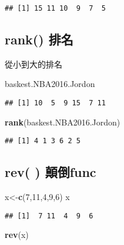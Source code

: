 \documentclass[]{article}
\newenvironment{Shaded}{\begin{snugshade}}{\end{snugshade}}
\newcommand{\DecValTok}[1]{\textcolor[rgb]{0.00,0.00,0.81}{#1}}
\newcommand{\KeywordTok}[1]{\textcolor[rgb]{0.13,0.29,0.53}{\textbf{#1}}}
\newcommand{\NormalTok}[1]{#1}
\begin{document}
\begin{verbatim}
## [1] 15 11 10  9  7  5
\end{verbatim}

\hypertarget{rank-ux6392ux540d}{%
\subsection{rank() 排名}\label{rank-ux6392ux540d}}

從小到大的排名

\begin{Shaded}
\begin{Highlighting}[]
\NormalTok{baskest.NBA2016.Jordon}
\end{Highlighting}
\end{Shaded}

\begin{verbatim}
## [1] 10  5  9 15  7 11
\end{verbatim}

\begin{Shaded}
\begin{Highlighting}[]
\KeywordTok{rank}\NormalTok{(baskest.NBA2016.Jordon)}
\end{Highlighting}
\end{Shaded}

\begin{verbatim}
## [1] 4 1 3 6 2 5
\end{verbatim}

\hypertarget{rev-ux985bux5012func}{%
\subsection{rev( ) 顛倒func}\label{rev-ux985bux5012func}}

\begin{Shaded}
\begin{Highlighting}[]
\NormalTok{x<-}\KeywordTok{c}\NormalTok{(}\DecValTok{7}\NormalTok{,}\DecValTok{11}\NormalTok{,}\DecValTok{4}\NormalTok{,}\DecValTok{9}\NormalTok{,}\DecValTok{6}\NormalTok{)}
\NormalTok{x}
\end{Highlighting}
\end{Shaded}

\begin{verbatim}
## [1]  7 11  4  9  6
\end{verbatim}

\begin{Shaded}
\begin{Highlighting}[]
\KeywordTok{rev}\NormalTok{(x)}
\end{Highlighting}
\end{Shaded}
\end{document}
